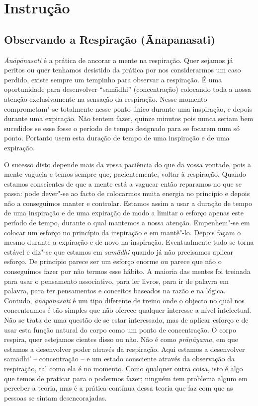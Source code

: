 \part{Instrução}

\chapter{Observando a Respiração (Ānāpānasati)}

\emph{Ānāpānasati} é a prática de ancorar a mente na respiração. Quer
sejamos já peritos ou quer tenhamos desistido da prática por nos
considerarmos um caso perdido, existe sempre um tempinho para observar a
respiração. É uma oportunidade para desenvolver ``samādhi''
(concentração) colocando toda a nossa atenção exclusivamente na sensação
da respiração. Nesse momento comprometam"-se totalmente nesse ponto único
durante uma inspiração, e depois durante uma expiração. Não tentem fazer,
quinze minutos pois nunca seriam bem sucedidos se esse fosse o período
de tempo designado para se focarem num só ponto. Portanto usem esta
duração de tempo de uma inspiração e de uma expiração.

O sucesso disto depende mais da vossa paciência do que da vossa vontade,
pois a mente vagueia e temos sempre que, pacientemente, voltar à
respiração. Quando estamos conscientes de que a mente está a vaguear
então reparamos no que se passa: pode dever"-se ao facto de colocarmos
muita energia no princípio e depois não a conseguimos manter e
controlar. Estamos assim a usar a duração de tempo de uma inspiração e de
uma expiração de modo a limitar o esforço apenas este período de tempo,
durante o qual mantemos a nossa atenção. Empenhem"-se em colocar um
esforço no princípio da inspiração e em mantê"-lo. Depois façam o
mesmo durante a expiração e de novo na inspiração. Eventualmente tudo se
torna estável e diz"-se que estamos em \emph{samādhi} quando já não
precisamos aplicar esforço. De princípio parece ser um esforço enorme ou
parece que não o conseguimos fazer por não termos esse hábito. A maioria
das mentes foi treinada para usar o pensamento associativo, para ler
livros, para ir de palavra em palavra, para ter pensamentos e conceitos
baseados na razão e na lógica. Contudo, \emph{ānāpānasati} é um tipo
diferente de treino onde o objecto no qual nos concentramos é tão
simples que não oferece qualquer interesse a nível intelectual. Não se
trata de uma questão de se estar interessado, mas de aplicar esforço e
de usar esta função natural do corpo como um ponto de concentração. O
corpo respira, quer estejamos cientes disso ou não. Não é como
\emph{prāṇāyama}, em que estamos a desenvolver poder através da
respiração. Aqui estamos a desenvolver samādhi' -- concentração -- e um
estado consciente através da observação da respiração, tal como ela é no
momento. Como qualquer outra coisa, isto é algo que temos de praticar
para o podermos fazer; ninguém tem problema algum em perceber a teoria,
mas é a prática contínua dessa teoria que faz com que as pessoas se
sintam desencorajadas.

